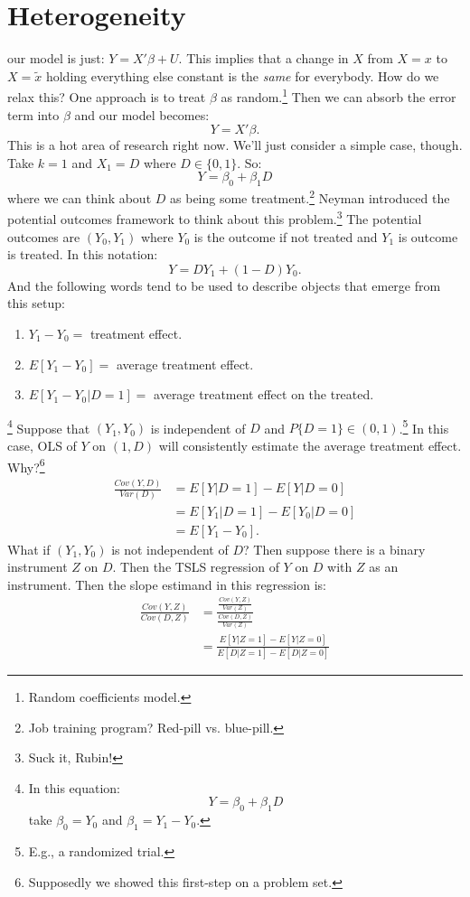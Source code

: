 \documentclass{tufte-book}
\theoremstyle{mytheoremstyle}
\theoremstyle{mylemstyle}
\theoremstyle{mydefstyle}
\begin{document}
\section{Heterogeneity} 
 our model is just: \(Y = X'\beta + U\). This implies that a change in \(X\) from \(X=x\) to \(X=\tilde{x}\) holding everything else constant is the \emph{same} for everybody. How do we relax this? One approach is to treat \(\beta\) as random.\footnote{Random coefficients model.} Then we can absorb the error term into \(\beta\) and our model becomes:
	\[Y = X'\beta \text{.}\]
This is a hot area of research right now. We'll just consider a simple case, though. Take \(k = 1\) and \(X_1 = D\) where \(D \in \{0, 1\}\). So:
	\[Y = \beta_0 + \beta_1 D\]
where we can think about \(D\) as being some treatment.\footnote{Job training program? Red-pill vs. blue-pill.} Neyman introduced the potential outcomes framework to think about this problem.\footnote{Suck it, Rubin!} The potential outcomes are \((Y_0, Y_1)\) where \(Y_0\) is the outcome if not treated and \(Y_1\) is outcome is treated. In this notation:
	\[Y = DY_1 + (1-D)Y_0 \text{.}\]
And the following words tend to be used to describe objects that emerge from this setup: \begin{enumerate}
	\item \(Y_1 - Y_0 = \) treatment effect.
	\item \(E[Y_1 - Y_0] =\) average treatment effect.
	\item \(E[Y_1 - Y_0 | D=1] =\) average treatment effect on the treated. \end{enumerate}
\footnote{In this equation:
	\[Y = \beta_0 + \beta_1 D\]
take \(\beta_0 = Y_0\) and \(\beta_1 = Y_1 - Y_0\).} Suppose that \((Y_1, Y_0)\) is independent of \(D\) and \(P\{D =1\} \in (0, 1)\).\footnote{E.g., a randomized trial.} In this case, OLS of \(Y\) on \((1, D)\) will consistently estimate the average treatment effect. Why?\footnote{Supposedly we showed this first-step on a problem set.}
	\begin{align*}
		\frac{Cov(Y, D)}{Var(D)} & = E[Y|D=1] - E[Y|D=0] \\
							& = E[Y_1 |D=1] - E[Y_0|D=0] \\
							& = E[Y_1 - Y_0] \text{.} \end{align*}
What if \((Y_1, Y_0)\) is not independent of \(D\)? Then suppose there is a binary instrument \(Z\) on \(D\). Then the TSLS regression of \(Y\) on \(D\) with \(Z\) as an instrument. Then the slope estimand in this regression is:
	\begin{align*}
		\frac{Cov(Y,Z)}{Cov(D, Z)} & = \frac{\frac{Cov(Y, Z)}{Var(Z)}}{\frac{Cov(D,Z)}{Var(Z)}} \\
							& = \frac{E[Y|Z=1] - E[Y|Z=0]}{E[D|Z=1] - E[D|Z=0]}
	\end{align*}
\end{document}
